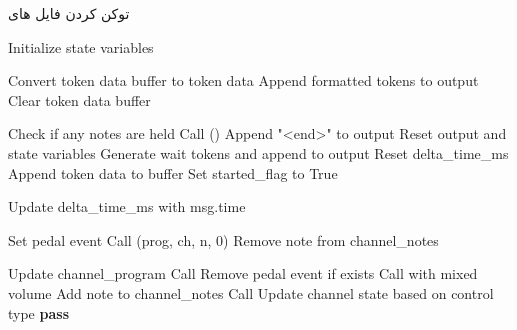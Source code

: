 \begin{LTR}
      \begin{algorithm}
            \caption{توکن کردن فایل های }
            \label{alg:token}
            \setmainfont{Times New Roman}
            \begin{algorithmic}[1]
                  \State Initialize state variables

                  \State Convert token data buffer to token data
                  \State Append formatted tokens to output
                  \State Clear token data buffer
                  \EndFunction

                  \State Check if any notes are held
                  \State Call ()
                  \State Append "<end>" to output
                  \State Reset output and state variables
                  \EndIf
                  \EndIf
                  \State Generate wait tokens and append to output
                  \State Reset delta\_time\_ms
                  \State Append token data to buffer
                  \State Set started\_flag to True
                  \EndIf
                  \EndFunction

                  \State Update delta\_time\_ms with msg.time

                  \State Set pedal event
                  \Else
                  \State Call (prog, ch, n, 0)
                  \State Remove note from channel\_notes
                  \EndIf
                  \EndFunction

                  \State Update channel\_program
                  \State Call 
                  \Else
                  \State Remove pedal event if exists
                  \State Call  with mixed volume
                  \State Add note to channel\_notes
                  \EndIf
                  \State Call 
                  \State Update channel state based on control type
                  \Else
                  \State \textbf{pass}
                  \EndIf
                  \EndFor


\end{algorithmic}
\end{algorithm}
\end{LTR}
